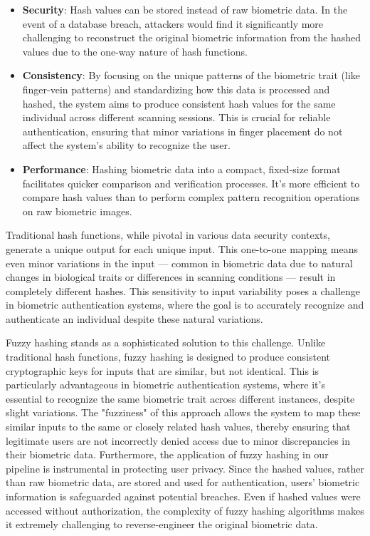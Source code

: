 \begin{itemize}
    \item \textbf{Security}: Hash values can be stored instead of raw biometric data. In the event of a database breach, attackers would find it significantly more challenging to reconstruct the original biometric information from the hashed values due to the one-way nature of hash functions.

    \item \textbf{Consistency}: By focusing on the unique patterns of the biometric trait (like finger-vein patterns) and standardizing how this data is processed and hashed, the system aims to produce consistent hash values for the same individual across different scanning sessions. This is crucial for reliable authentication, ensuring that minor variations in finger placement do not affect the system's ability to recognize the user.

    \item \textbf{Performance}: Hashing biometric data into a compact, fixed-size format facilitates quicker comparison and verification processes. It's more efficient to compare hash values than to perform complex pattern recognition operations on raw biometric images.
\end{itemize}

Traditional hash functions, while pivotal in various data security contexts, generate a unique output for each unique input. This one-to-one mapping means even minor variations in the input — common in biometric data due to natural changes in biological traits or differences in scanning conditions — result in completely different hashes. This sensitivity to input variability poses a challenge in biometric authentication systems, where the goal is to accurately recognize and authenticate an individual despite these natural variations.

Fuzzy hashing stands as a sophisticated solution to this challenge. Unlike traditional hash functions, fuzzy hashing is designed to produce consistent cryptographic keys for inputs that are similar, but not identical. This is particularly advantageous in biometric authentication systems, where it's essential to recognize the same biometric trait across different instances, despite slight variations. The "fuzziness" of this approach allows the system to map these similar inputs to the same or closely related hash values, thereby ensuring that legitimate users are not incorrectly denied access due to minor discrepancies in their biometric data.
Furthermore, the application of fuzzy hashing in our pipeline is instrumental in protecting user privacy. Since the hashed values, rather than raw biometric data, are stored and used for authentication, users' biometric information is safeguarded against potential breaches. Even if hashed values were accessed without authorization, the complexity of fuzzy hashing algorithms makes it extremely challenging to reverse-engineer the original biometric data.

